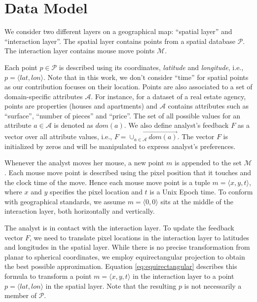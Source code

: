\section{Data Model}
\label{sec:datamodel}
We consider two different layers on a geographical map: ``spatial layer'' and ``interaction layer''. The spatial layer contains points from a spatial database $\mathcal{P}$. The interaction layer contains mouse move points $\mathcal{M}$.

\vspace{2pt}
 Each point $p \in \mathcal{P}$ is described using its coordinates, {\em latitude} and {\em longitude}, i.e., $p = \langle \mathit{lat}, \mathit{lon} \rangle$. Note that in this work, we don't consider ``time'' for spatial points as our contribution focuses on their location. Points are also associated to a set of domain-specific attributes $\mathcal{A}$. For instance, for a dataset of a real estate agency, points are properties (houses and apartments) and $\mathcal{A}$ contains attributes such as ``surface'', ``number of pieces'' and  ``price''. The set of all possible values for an attribute $a \in \mathcal{A}$ is denoted as $dom(a)$. We also define analyst's feedback $F$ as a vector over all attribute values, i.e., $F = \overrightarrow{\cup_{a \in \mathcal{A}}dom(a)}$. The vector $F$ is initialized by zeros and will be manipulated to express analyst's preferences.

\vspace{2pt}
 Whenever the analyst moves her mouse, a new point $m$ is appended to the set $\mathcal{M}$. Each mouse move point is described using the pixel position that it touches and the clock time of the move. Hence each mouse move point is a tuple $m = \langle x, y, t \rangle$, where $x$ and $y$ specifies the pixel location and $t$ is a Unix Epoch time. To conform with geographical standards, we assume $m = \langle 0, 0\rangle$ sits at the middle of the interaction layer, both horizontally and vertically.

\vspace{2pt}
The analyst is in contact with the interaction layer. To update the feedback vector $F$, we need to translate pixel locations in the interaction layer to latitudes and longitudes in the spatial layer. While there is no precise transformation from planar to spherical coordinates, we employ equirectangular projection to obtain the best possible approximation. Equation \ref{eq:equirectangular} describes this formula to transform a point $m = \langle x,y,t \rangle$ in the interaction layer to a point $p = \langle lat, lon \rangle$ in the spatial layer. Note that the resulting $p$ is not necessarily a member of $\mathcal{P}$. 

